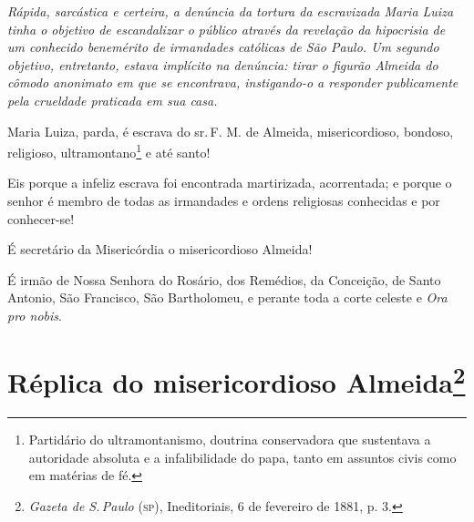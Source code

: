 
\begin{resumo}
\emph{Rápida, sarcástica e certeira, a denúncia da tortura da
escravizada Maria Luiza tinha o objetivo de escandalizar o público
através da revelação da hipocrisia de um conhecido benemérito de
irmandades católicas de São Paulo. Um segundo objetivo,
entretanto, estava implícito na denúncia: tirar o figurão Almeida do
cômodo anonimato em que se encontrava, instigando-o a responder
publicamente pela crueldade praticada em sua casa.}
\end{resumo}

Maria Luiza, parda, é escrava do sr.\,F. M. de Almeida, misericordioso,
bondoso, religioso, ultramontano\footnote{Partidário do
  ultramontanismo, doutrina conservadora que sustentava a autoridade
  absoluta e a infalibilidade do papa, tanto em assuntos civis como em
  matérias de fé.} e até
santo!

Eis porque a infeliz escrava foi encontrada martirizada, acorrentada; e
porque o senhor é membro de todas as irmandades e ordens religiosas
conhecidas e por conhecer-se!

É secretário da Misericórdia o misericordioso Almeida!

É irmão de Nossa Senhora do Rosário, dos Remédios, da Conceição, de
Santo Antonio, São Francisco, São Bartholomeu, e perante toda a corte
celeste e \emph{Ora pro nobis}.

\pagebreak
\section{Réplica do misericordioso Almeida\protect\footnote{
\emph{\MakeUppercase{G}azeta de \MakeUppercase{S}.\,\MakeUppercase{P}aulo} (\textsc{sp}), \MakeUppercase{I}neditoriais, 6 de fevereiro de 1881, p. 3.}}

